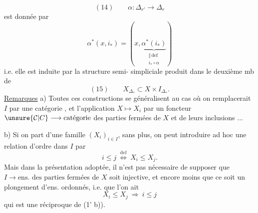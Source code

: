 \[
(14)\qquad\alpha:\Delta_{r'}\longrightarrow\Delta_r
\]
est donnée par
\[
\alpha^*(x,i_*)=(x,\underbrace{\alpha^*(i_*)}_{\substack{\Vert\,\mathrm{def}\\i_*\circ\alpha}})
\]
i.e. elle est induite par la structure semi-
simpliciale produit dans le deuxième mb de
\[
(15)\qquad X_{\Delta_*}\subset X\times I_{\Delta_*}.
\]
\uline{Remarques} a) Toutes ces constructions se généralisent au
cas où on remplacerait  $I$ par une catégorie , et
l'application $X\mapsto X_i$ par un foncteur $\unsure{\mathcal{C}|C}\longrightarrow\text{catégorie}$
des parties fermées de $X$ et de leurs inclusions
...

b) Si on part d'une famille $(X_i)_{i\in I}$,  sans
plus, on peut introduire ad hoc une relation
d'ordre dans $I$ par 
\[
i\leq j\ \overset{\mathrm{def}}{\Longleftrightarrow}\ X_i\leq X_j.
\]
Mais dans la présentation adoptée, il n'est pas
nécessaire de supposer que  $I\longrightarrow\text{ens. des parties}$
fermées de $X$ soit injective, et encore moins
que ce soit un plongement d'ens. ordonnés,
i.e. que l'on ait
\[
X_i\leq X_j\ \Longrightarrow\ i\leq j
\]
qui est une réciproque de (1' b)).
